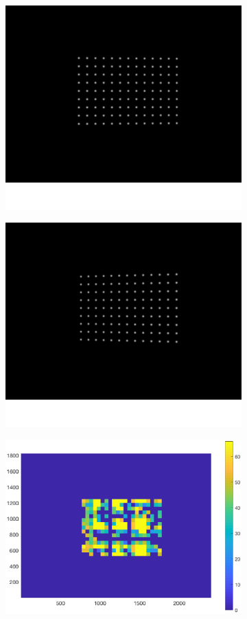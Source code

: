 \begin{figure}[h!]
	\centering
	\begin{subfigure}[t]{0.18\linewidth}
		\centering
		\includegraphics[width=0.8\linewidth]{figures/part2/test_left_1}
	\end{subfigure}
	\begin{subfigure}[t]{0.18\linewidth}
		\centering
		\includegraphics[width=0.8\linewidth]{figures/part2/test_right_1}
	\end{subfigure}
	\begin{subfigure}[t]{0.20\linewidth}
		\centering
		\includegraphics[width=1\linewidth]{figures/part2/test1_cmp}

\end{subfigure}
\end{figure}

